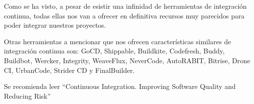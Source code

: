 Como se ha visto, a pesar de esistir una infinidad de herramientas de integración continua, todas ellas nos van a ofrecer en definitiva recursos muy parecidos para poder integrar nuestros proyectos.

Otras herramientas a mencionar que nos ofrecen características similares de integración continua son: GoCD, Shippable, Buildkite, Codefresh, Buddy, Buildbot, Wercker, Integrity, WeaveFlux, NeverCode, AutoRABIT, Bitrise, Drone CI, UrbanCode, Strider CD y FinalBuilder.

Se recomienda leer ``Continuous Integration. Improving Software Quality and Reducing Risk'' \cite{CI_Paul_Duvall} 
